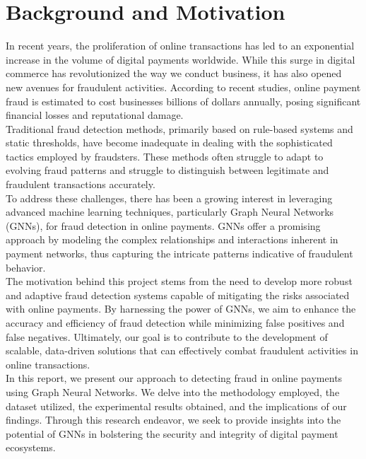 \section{Background and Motivation}
\hspace{\parindent}
In recent years, the proliferation of online transactions has led to an exponential increase in the volume of digital payments worldwide. While this surge in digital commerce has revolutionized the way we conduct business, it has also opened new avenues for fraudulent activities. According to recent studies, online payment fraud is estimated to cost businesses billions of dollars annually, posing significant financial losses and reputational damage.\\

Traditional fraud detection methods, primarily based on rule-based systems and static thresholds, have become inadequate in dealing with the sophisticated tactics employed by fraudsters. These methods often struggle to adapt to evolving fraud patterns and struggle to distinguish between legitimate and fraudulent transactions accurately.\\

To address these challenges, there has been a growing interest in leveraging advanced machine learning techniques, particularly Graph Neural Networks (GNNs), for fraud detection in online payments. GNNs offer a promising approach by modeling the complex relationships and interactions inherent in payment networks, thus capturing the intricate patterns indicative of fraudulent behavior.\\

The motivation behind this project stems from the need to develop more robust and adaptive fraud detection systems capable of mitigating the risks associated with online payments. By harnessing the power of GNNs, we aim to enhance the accuracy and efficiency of fraud detection while minimizing false positives and false negatives. Ultimately, our goal is to contribute to the development of scalable, data-driven solutions that can effectively combat fraudulent activities in online transactions.\\

In this report, we present our approach to detecting fraud in online payments using Graph Neural Networks. We delve into the methodology employed, the dataset utilized, the experimental results obtained, and the implications of our findings. Through this research endeavor, we seek to provide insights into the potential of GNNs in bolstering the security and integrity of digital payment ecosystems.\\

